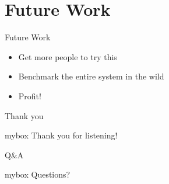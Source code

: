 \documentclass[10pt,aspectratio=43,mathserif,table]{beamer}
\begin{document}
\section{Future Work}
\begin{frame}{Future Work}  %
\begin{itemize}
\item<0-> Get more people to try this
\item<0-> Benchmark the entire system in the wild
\item<0-> Profit!
\end{itemize}
\end{frame}

\begin{frame}{Thank you}
\begin{center}
\begin{minipage}{1\textwidth}
 \begin{beamercolorbox}[wd=0.70\textwidth, rounded=true, shadow=true]{mybox}
\LARGE \centering Thank you for listening!  %
\end{beamercolorbox}
 \end{minipage}
\end{center}
\end{frame}

\begin{frame}{Q\&A}
\begin{center}
	\begin{minipage}{1\textwidth}
		\begin{beamercolorbox}[wd=0.70\textwidth, rounded=true, shadow=true]{mybox}
			\LARGE \centering  Questions?  %
		\end{beamercolorbox}
	\end{minipage}
\end{center}
\end{frame}

\end{document}
